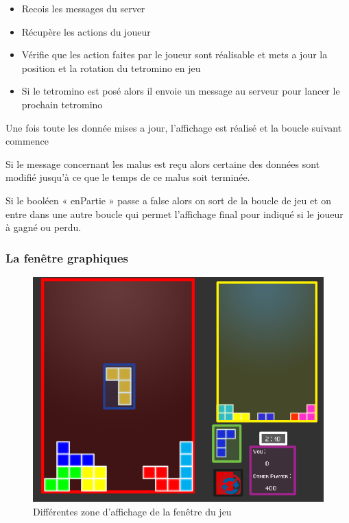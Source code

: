 \documentclass[a4paper, 12pt]{article}
\begin{document}
	\begin{itemize}
		\item Recois les messages du server
		\item Récupère les actions du joueur
		\item Vérifie que les action faites par le joueur sont réalisable et mets a jour la position et la rotation du tetromino en jeu
		\item Si le tetromino est posé alors il envoie un message au serveur pour lancer le prochain tetromino
	\end{itemize}

		Une fois toute les donnée mises a jour, l’affichage est réalisé et la boucle suivant commence

		Si le message concernant les malus est reçu alors certaine des données sont modifié jusqu’à ce que le temps de ce malus soit terminée.

		Si le booléen « enPartie » passe a false alors on sort de la boucle de jeu et on entre dans une autre boucle qui permet l’affichage final pour indiqué si le joueur à gagné ou perdu.

		\subsubsection{La fenêtre graphiques}

			\begin{figure}[bt]
				\centering
				\includegraphics[scale=0.35]{img/fenetre.png}
				\caption{Différentes zone d'affichage de la fenêtre du jeu}
				\label{fig:fen}
			\end{figure}
\end{document}
